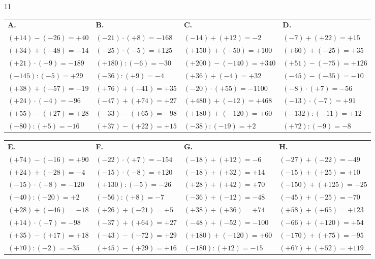 \begin{solution}{11}

\def\arraystretch{1.7}
\begin{tabularx}{\linewidth}{*{4}{X}}
\textbf{A.} & \textbf{B.} & \textbf{C.} & \textbf{D.} \\
$(+14)-(-26)=+40$ & $(-21)\cdot(+8)=-168$ & $(-14)+(+12)=-2$ & $(-7)+(+22)=+15$ \\
$(+34)+(-48)=-14$ & $(-25)\cdot(-5)=+125$ & $(+150)+(-50)=+100$ & $(+60)+(-25)=+35$ \\
$(+21)\cdot(-9)=-189$ & $(+180):(-6)=-30$ & $(+200)-(-140)=+340$ & $(+51)-(-75)=+126$ \\
$(-145):(-5)=+29$ & $(-36):(+9)=-4$ & $(+36)+(-4)=+32$ & $(-45)-(-35)=-10$ \\
$(+38)+(-57)=-19$ & $(+76)+(-41)=+35$ & $(-20)\cdot(+55)=-1100$ & $(-8)\cdot(+7)=-56$ \\
$(+24)\cdot(-4)=-96$ & $(-47)+(+74)=+27$ & $(+480)+(-12)=+468$ & $(-13)\cdot(-7)=+91$ \\
$(+55)-(+27)=+28$ & $(-33)-(+65)=-98$ & $(+180)+(-120)=+60$ & $(-132):(-11)=+12$ \\
$(-80):(+5)=-16$ & $(+37)-(+22)=+15$ & $(-38):(-19)=+2$ & $(+72):(-9)=-8$ \\
\end{tabularx}

\bigskip
\begin{tabularx}{\linewidth}{*{4}{X}}
\textbf{E.} & \textbf{F.} & \textbf{G.} & \textbf{H.} \\
$(+74)-(-16)=+90$ & $(-22)\cdot(+7)=-154$ & $(-18)+(+12)=-6$ & $(-27)+(-22)=-49$ \\
$(+24)+(-28)=-4$ & $(-15)\cdot(-8)=+120$ & $(-18)+(+32)=+14$ & $(-15)+(+25)=+10$ \\
$(-15)\cdot(+8)=-120$ & $(+130):(-5)=-26$ & $(+28)+(+42)=+70$ & $(-150)+(+125)=-25$ \\
$(-40):(-20)=+2$ & $(-56):(+8)=-7$ & $(-36)+(-12)=-48$ & $(-45)+(-25)=-70$ \\
$(+28)+(-46)=-18$ & $(+26)+(-21)=+5$ & $(+38)+(+36)=+74$ & $(+58)+(+65)=+123$ \\
$(+14)\cdot(-7)=-98$ & $(-37)+(+64)=+27$ & $(-48)+(-52)=-100$ & $(-66)+(+120)=+54$ \\
$(+35)-(+17)=+18$ & $(-43)-(-72)=+29$ & $(+180)+(-120)=+60$ & $(-170)+(+75)=-95$ \\
$(+70):(-2)=-35$ & $(+45)-(+29)=+16$ & $(-180):(+12)=-15$ & $(+67)+(+52)=+119$ \\
\end{tabularx}


\end{solution}
